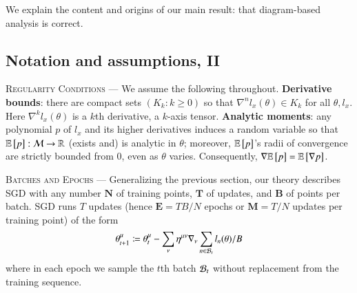 We explain the content and origins of our main
result: that diagram-based analysis is correct.

        \subsection{Notation and assumptions, II}\label{sect:background}


\textsc{Regularity Conditions} ---
We assume the following throughout.
%
\textbf{Derivative bounds}:
there are compact sets $(K_k: k\geq 0)$ so that
$\nabla^n l_x(\theta)\in K_k$ for all $\theta,l_x$. 
Here $\nabla^k
l_x(\theta)$ is a $k$th derivative, a $k$-axis tensor.
%
\textbf{Analytic moments}:
any polynomial $p$ of $l_x$ and its higher derivatives
induces a random variable so that
$\mathbb{E}\left[p\right]:\mathcal{M}\to\mathbb{R}$ (exists and) is analytic in $\theta$;
moreover, $\mathbb{E}\left[p\right]$'s radii of convergence are strictly bounded from $0$,
even as $\theta$ varies.
%
Consequently, $\nabla \mathbb{E}\left[p\right]=\mathbb{E}\left[\nabla p\right]$.


            \textsc{Batches and Epochs} --- Generalizing the previous section,
            our theory describes SGD with
            any number
                {$\mathbf{N}$ of training points},
                {$\mathbf{T}$ of updates}, and 
                {$\mathbf{B}$ of points per batch}.
            SGD runs $T$ updates (hence
                {$\mathbf{E}=TB/N$ epochs} or
                {$\mathbf{M}=T/N$ updates per training point}) of the form
            $$
                \theta_{t+1}^\mu
                \coloneqq
                \theta_t^\mu -
                \sum_\nu
                \eta^{\mu\nu} \nabla_\nu
                    \sum_{n\in \mathcal{B}_t} l_n(\theta) / B
            $$
            where in each epoch %
            we sample the
            $t$th batch $\mathcal{B}_t$ without replacement from the training sequence.

